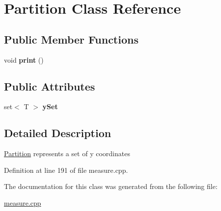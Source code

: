\hypertarget{classPartition}{}\section{Partition Class Reference}
\label{classPartition}
\subsection*{Public Member Functions}
\begin{DoxyCompactItemize}
\item 
\mbox{\label{classPartition_a84674cf42f548ed5216d8a568e9f20d3}} 
void {\bfseries print} ()
\end{DoxyCompactItemize}
\subsection*{Public Attributes}
\begin{DoxyCompactItemize}
\item 
\mbox{\label{classPartition_ab6bfda1c86800ec690019f0d52ae2d27}} 
set$<$ T $>$ {\bfseries y\+Set}
\end{DoxyCompactItemize}


\subsection{Detailed Description}
\hyperlink{classPartition}{Partition} represents a set of y coordinates 

Definition at line 191 of file measure.\+cpp.



The documentation for this class was generated from the following file\+:\begin{DoxyCompactItemize}
\item 
\hyperlink{measure_8cpp}{measure.\+cpp}\end{DoxyCompactItemize}

